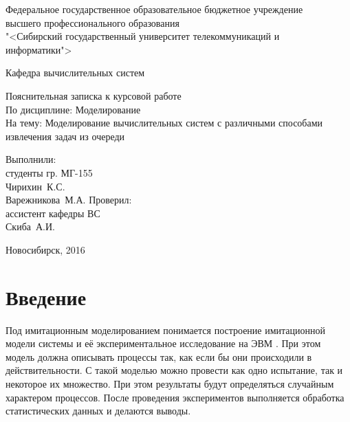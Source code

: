 \documentclass[russian, 14pt, a4paper]{extreport}
\begin{document}
\lstset{
  basicstyle=\ttfamily,
  columns=fullflexible,
  keepspaces=true,
  fontadjust=true,
  basewidth=0.5mm
}

\begin{titlepage}
  \begin{center}
    Федеральное государственное образовательное бюджетное учреждение\\
    высшего профессионального образования\\
    "<Сибирский государственный университет телекоммуникаций и\\
    информатики">
  \end{center}
  \vfill \vfill
  \begin{flushright}
    Кафедра вычислительных систем
  \end{flushright}
  \vfill \vfill \vfill
  \begin{center}
    \begin{bfseries}
      {\large Пояснительная записка к курсовой работе}\\
      По дисциплине: Моделирование\\
      На тему: Моделирование вычислительных систем с различными способами извлечения задач из очереди\\
    \end{bfseries}
  \end{center}
  \vfill \vfill
  \begin{flushright}
    Выполнили:\\
    студенты гр. МГ-155\\
    Чирихин~К.С.\\
    Варежникова~М.А. \vfill
    Проверил:\\
    ассистент кафедры ВС\\
    Скиба~А.И.
  \end{flushright}
  \vfill \vfill \vfill \vfill \vfill \centerline{Новосибирск, 2016}
\end{titlepage}
\setcounter{page}{2}
\tableofcontents
\chapter{Введение}
Под имитационным моделированием понимается построение имитационной модели системы и её экспериментальное исследование на ЭВМ \cite{book:rad}. При этом модель должна описывать процессы так, как если бы они происходили в действительности. С такой моделью можно провести как одно испытание, так и некоторое их множество. При этом результаты будут определяться случайным характером процессов. После проведения экспериментов выполняется обработка статистических данных и делаются выводы.
\end{document}
